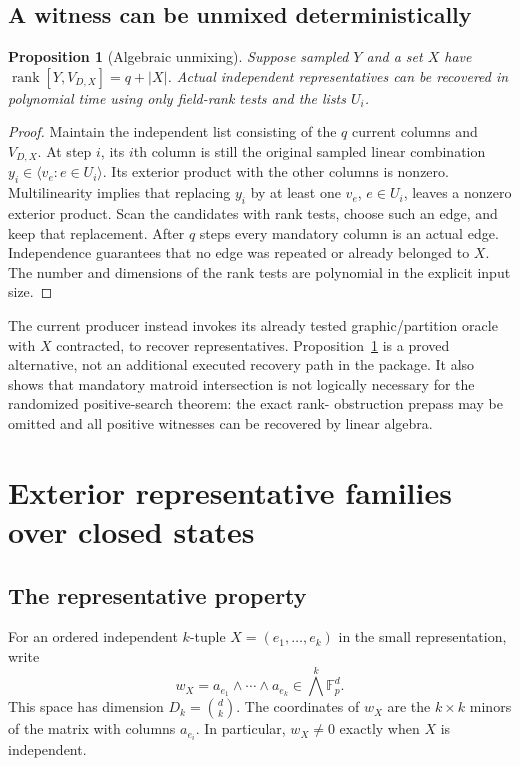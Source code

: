 \documentclass[11pt,letterpaper]{article}
\newtheorem{proposition}[theorem]{Proposition}
\theoremstyle{definition}
\newcommand{\F}{\mathbb F}
\newcommand{\rk}{\operatorname{rank}}
\begin{document}
\subsection{A witness can be unmixed deterministically}
\begin{proposition}[Algebraic unmixing]\label{prop:unmix}
Suppose sampled $Y$ and a set $X$ have $\rk[Y,V_{D,X}]=q+|X|$.
Actual independent representatives can be recovered in polynomial time
using only field-rank tests and the lists $U_i$.
\end{proposition}
\begin{proof}
Maintain the independent list consisting of the $q$ current columns and
$V_{D,X}$. At step $i$, its $i$th column is still the original sampled
linear combination $y_i\in\langle v_e:e\in U_i\rangle$. Its exterior
product with the other columns is nonzero. Multilinearity implies that
replacing $y_i$ by at least one $v_e$, $e\in U_i$, leaves a nonzero exterior
product. Scan the candidates with rank tests, choose such an edge, and keep
that replacement. After $q$ steps every mandatory column is an actual edge.
Independence guarantees that no edge was repeated or already belonged to
$X$. The number and dimensions of the rank tests are polynomial in the
explicit input size.
\end{proof}
The current producer instead invokes its already tested graphic/partition
oracle with $X$ contracted, to recover representatives. Proposition~\ref{prop:unmix}
is a proved alternative, not an additional executed recovery path in the
package. It also shows that mandatory matroid intersection is not logically
necessary for the randomized positive-search theorem: the exact rank-
obstruction prepass may be omitted and all positive witnesses can be recovered
by linear algebra.

\section{Exterior representative families over closed states}\label{sec:dp}
\subsection{The representative property}
For an ordered independent $k$-tuple $X=(e_1,\ldots,e_k)$ in the small
representation, write
\[
 w_X=a_{e_1}\wedge\cdots\wedge a_{e_k}
     \in\bigwedge^k\F_p^d.
\]
This space has dimension $D_k=\binom dk$. The coordinates of $w_X$ are the
$k\times k$ minors of the matrix with columns $a_{e_i}$. In particular,
$w_X\ne0$ exactly when $X$ is independent.
\end{document}
